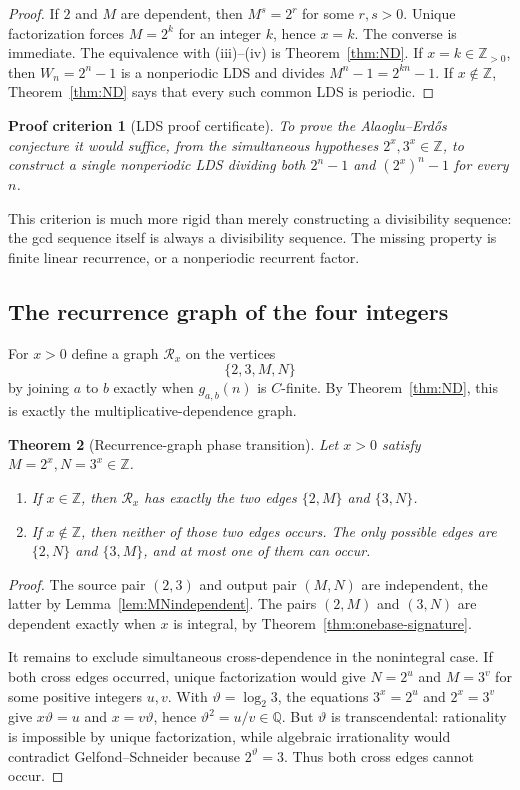 \documentclass[11pt,oneside]{article}
\newtheorem{theorem}{Theorem}[section]
\newtheorem{criterion}[theorem]{Proof criterion}
\theoremstyle{definition}
\theoremstyle{remark}
\newcommand{\Z}{\mathbb Z}
\newcommand{\Q}{\mathbb Q}
\newcommand{\AEconj}{Alaoglu--Erd\H{o}s}
\begin{document}
\begin{proof}
If $2$ and $M$ are dependent, then $M^s=2^r$ for some $r,s>0$.
Unique factorization forces $M=2^k$ for an integer $k$, hence $x=k$.
The converse is immediate.  The equivalence with (iii)--(iv) is
Theorem~\ref{thm:ND}.  If $x=k\in\Z_{>0}$, then
$W_n=2^n-1$ is a nonperiodic LDS and divides
$M^n-1=2^{kn}-1$.  If $x\notin\Z$, Theorem~\ref{thm:ND} says that every such common LDS is
periodic.
\end{proof}

\begin{criterion}[LDS proof certificate]
\label{crit:LDS}
To prove the \AEconj{} conjecture it would suffice, from the simultaneous hypotheses
$2^x,3^x\in\Z$, to construct a single nonperiodic LDS dividing both
$2^n-1$ and $(2^x)^n-1$ for every $n$.
\end{criterion}

This criterion is much more rigid than merely constructing a divisibility sequence: the gcd
sequence itself is always a divisibility sequence.  The missing property is finite linear
recurrence, or a nonperiodic recurrent factor.

\subsection{The recurrence graph of the four integers}

For $x>0$ define a graph $\mathcal R_x$ on the vertices
\[
 \{2,3,M,N\}
\]
by joining $a$ to $b$ exactly when $g_{a,b}(n)$ is $C$-finite.  By
Theorem~\ref{thm:ND}, this is exactly the multiplicative-dependence graph.

\begin{theorem}[Recurrence-graph phase transition]
\label{thm:graph}
Let $x>0$ satisfy $M=2^x,N=3^x\in\Z$.
\begin{enumerate}[label=\textup{(\roman*)}]
\item If $x\in\Z$, then $\mathcal R_x$ has exactly the two edges
$\{2,M\}$ and $\{3,N\}$.
\item If $x\notin\Z$, then neither of those two edges occurs.  The only possible edges are
$\{2,N\}$ and $\{3,M\}$, and at most one of them can occur.
\end{enumerate}
\end{theorem}

\begin{proof}
The source pair $(2,3)$ and output pair $(M,N)$ are independent, the latter by
Lemma~\ref{lem:MNindependent}.  The pairs $(2,M)$ and $(3,N)$ are dependent exactly when
$x$ is integral, by Theorem~\ref{thm:onebase-signature}.

It remains to exclude simultaneous cross-dependence in the nonintegral case.  If both cross
edges occurred, unique factorization would give $N=2^u$ and $M=3^v$ for some positive
integers $u,v$.  With $\vartheta=\log_2 3$, the equations
$3^x=2^u$ and $2^x=3^v$ give $x\vartheta=u$ and $x=v\vartheta$, hence
$\vartheta^2=u/v\in\Q$.  But $\vartheta$ is transcendental: rationality is impossible by
unique factorization, while algebraic irrationality would contradict Gelfond--Schneider
because $2^\vartheta=3$.  Thus both cross edges cannot occur.
\end{proof}
\end{document}
